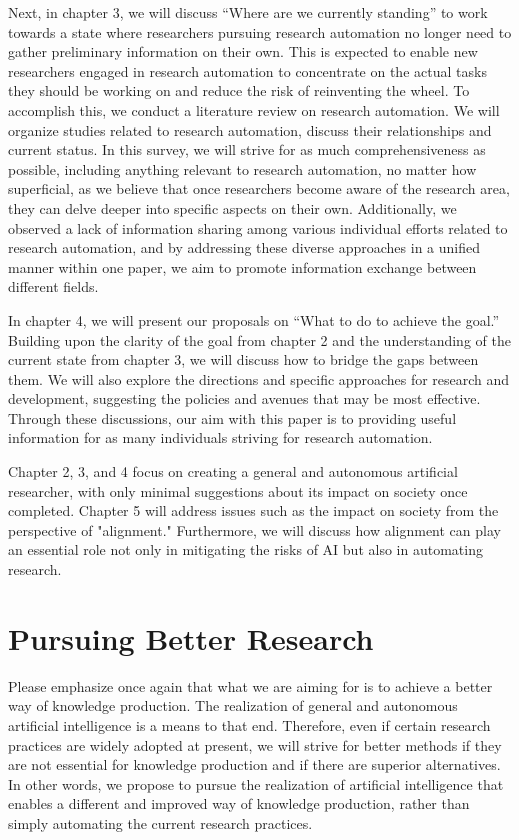 \documentclass{book}
\begin{document}
Next, in chapter 3, we will discuss ``Where are we currently standing'' to work towards a state where researchers pursuing research automation no longer need to gather preliminary information on their own. This is expected to enable new researchers engaged in research automation to concentrate on the actual tasks they should be working on and reduce the risk of reinventing the wheel. To accomplish this, we conduct a literature review on research automation. We will organize studies related to research automation, discuss their relationships and current status. In this survey, we will strive for as much comprehensiveness as possible, including anything relevant to research automation, no matter how superficial, as we believe that once researchers become aware of the research area, they can delve deeper into specific aspects on their own. Additionally, we observed a lack of information sharing among various individual efforts related to research automation, and by addressing these diverse approaches in a unified manner within one paper, we aim to promote information exchange between different fields.

In chapter 4, we will present our proposals on ``What to do to achieve the goal.'' Building upon the clarity of the goal from chapter 2 and the understanding of the current state from chapter 3, we will discuss how to bridge the gaps between them. We will also explore the directions and specific approaches for research and development, suggesting the policies and avenues that may be most effective. Through these discussions, our aim with this paper is to providing useful information for as many individuals striving for research automation.

Chapter 2, 3, and 4 focus on creating a general and autonomous artificial researcher, with only minimal suggestions about its impact on society once completed. Chapter 5 will address issues such as the impact on society from the perspective of "alignment." Furthermore, we will discuss how alignment can play an essential role not only in mitigating the risks of AI but also in automating research.

\section{Pursuing Better Research}
Please emphasize once again that what we are aiming for is to achieve a better way of knowledge production. The realization of general and autonomous artificial intelligence is a means to that end. Therefore, even if certain research practices are widely adopted at present, we will strive for better methods if they are not essential for knowledge production and if there are superior alternatives. In other words, we propose to pursue the realization of artificial intelligence that enables a different and improved way of knowledge production, rather than simply automating the current research practices.
\end{document}
